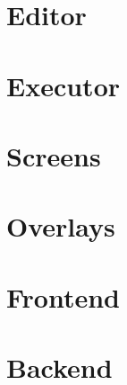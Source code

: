 \documentclass[12pt,twoside]{article}
\begin{document}


\tableofcontents


\clearpage

\clearpage

\section{Editor}

\section{Executor}

\section{Screens}

\section{Overlays}

\section{Frontend}

\section{Backend}
\end{document}
